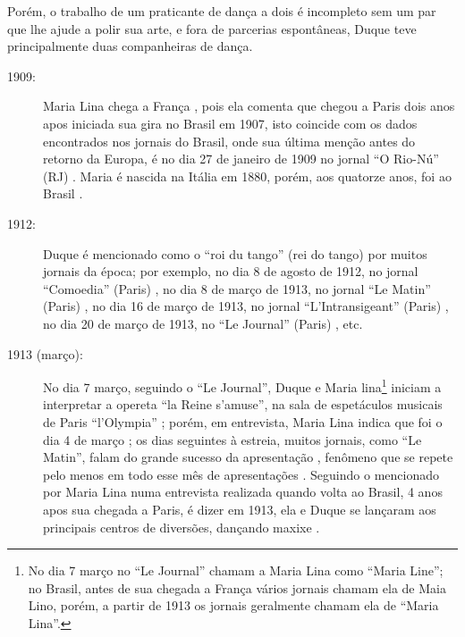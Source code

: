 Porém, o trabalho de um praticante de dança a dois é incompleto sem um par
que lhe ajude a polir sua arte,
e fora de parcerias espontâneas, Duque teve principalmente duas companheiras de dança.
\begin{description}

\item[1909:] Maria Lina chega a França \cite[pp. 3]{maxixe1913marialina},
pois ela comenta que chegou a Paris dois anos apos iniciada sua gira no Brasil em 1907,
isto coincide com os dados encontrados nos jornais do Brasil, 
onde sua última menção antes do retorno da Europa,
é no dia 27 de janeiro de 1909 no jornal ``O Rio-Nú'' (RJ) \cite[pp. 3]{maxixe1909maria}.
Maria é nascida na Itália em 1880, porém, aos quatorze anos, foi ao Brasil \cite[pp. 63]{efege1974maxixe}.



\item[1912:] Duque é mencionado como o ``roi du tango'' (rei do tango)
por muitos jornais da época; por exemplo,
no dia 8 de agosto de 1912, no jornal ``Comoedia'' (Paris) \cite[pp. 3]{maxixe1913reidotango:0:b},
no dia 8 de março de 1913, no jornal ``Le Matin'' (Paris) \cite[pp. 4]{maxixe1913reidotango:0},
no dia 16 de março de 1913, no jornal ``L'Intransigeant'' (Paris)  \cite[pp. 3]{maxixe1913reidotango:1},
no dia 20 de março de 1913, no ``Le Journal'' (Paris) \cite[pp. 7]{maxixe1913reidotango:2}, 
etc.


\item[1913 (março):] No dia 7 março, seguindo o ``Le Journal'',  Duque e Maria lina\footnote{No dia 7 março
no ``Le Journal'' chamam a Maria Lina como ``Maria Line'';
no Brasil, antes de sua chegada a França vários jornais chamam ela de Maia Lino,
porém, a partir de 1913 os jornais geralmente chamam ela de ``Maria Lina''.} 
iniciam a interpretar a opereta ``la Reine s'amuse'',
na sala de espetáculos musicais de Paris ``l'Olympia'' \cite[pp. 8]{maxixe1913reidotango:0:a};
porém, em entrevista, Maria Lina indica que foi o dia 4 de março \cite[pp. 3]{maxixe1913marialina};
os dias seguintes à estreia, muitos jornais, como ``Le Matin'',
falam do grande sucesso da apresentação \cite[pp. 4]{maxixe1913reidotango:0},
fenômeno que se repete pelo menos em todo esse mês de apresentações 
\cite[pp. 4]{maxixe1913reidotango:0} \cite[pp. 3]{maxixe1913reidotango:1} \cite[pp. 7]{maxixe1913reidotango:2}.
Seguindo o mencionado por Maria Lina numa entrevista realizada quando volta ao Brasil,
4 anos apos sua chegada a Paris, é dizer em 1913, 
ela e Duque se lançaram aos principais centros de diversões, dançando maxixe \cite[pp. 3]{maxixe1913marialina}.



\end{description}
